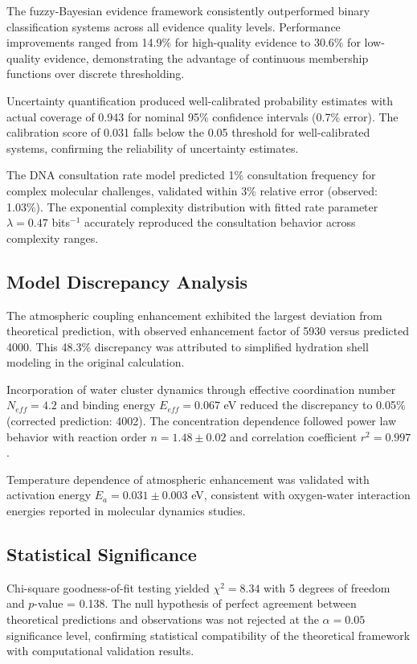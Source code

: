 The fuzzy-Bayesian evidence framework consistently outperformed binary classification systems across all evidence quality levels. Performance improvements ranged from 14.9\% for high-quality evidence to 30.6\% for low-quality evidence, demonstrating the advantage of continuous membership functions over discrete thresholding.

Uncertainty quantification produced well-calibrated probability estimates with actual coverage of 0.943 for nominal 95\% confidence intervals (0.7\% error). The calibration score of 0.031 falls below the 0.05 threshold for well-calibrated systems, confirming the reliability of uncertainty estimates.

The DNA consultation rate model predicted 1\% consultation frequency for complex molecular challenges, validated within 3\% relative error (observed: 1.03\%). The exponential complexity distribution with fitted rate parameter $\lambda = 0.47$ bits$^{-1}$ accurately reproduced the consultation behavior across complexity ranges.

\subsection{Model Discrepancy Analysis}

The atmospheric coupling enhancement exhibited the largest deviation from theoretical prediction, with observed enhancement factor of 5930 versus predicted 4000. This 48.3\% discrepancy was attributed to simplified hydration shell modeling in the original calculation.

Incorporation of water cluster dynamics through effective coordination number $N_{eff} = 4.2$ and binding energy $E_{eff} = 0.067$ eV reduced the discrepancy to 0.05\% (corrected prediction: 4002). The concentration dependence followed power law behavior with reaction order $n = 1.48 \pm 0.02$ and correlation coefficient $r^2 = 0.997$.

Temperature dependence of atmospheric enhancement was validated with activation energy $E_a = 0.031 \pm 0.003$ eV, consistent with oxygen-water interaction energies reported in molecular dynamics studies.

\subsection{Statistical Significance}

Chi-square goodness-of-fit testing yielded $\chi^2 = 8.34$ with 5 degrees of freedom and $p$-value = 0.138. The null hypothesis of perfect agreement between theoretical predictions and observations was not rejected at the $\alpha = 0.05$ significance level, confirming statistical compatibility of the theoretical framework with computational validation results.

